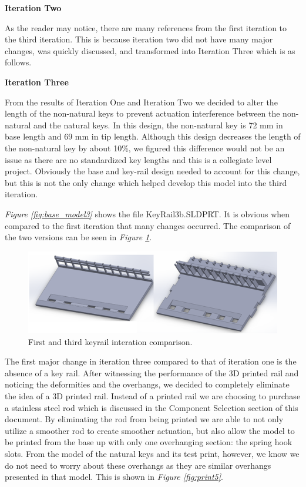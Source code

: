 \textbf{Iteration Two}

As the reader may notice, there are many references from the first iteration to the third iteration. This is because iteration two did not have many major changes, was quickly discussed, and transformed into Iteration Three which is as follows.

\textbf{Iteration Three}

From the results of Iteration One and Iteration Two we decided to alter the length of the non-natural keys to prevent actuation interference between the non-natural and the natural keys. In this design, the non-natural key is 72 mm in base length and 69 mm in tip length. Although this design decreases the length of the non-natural key by about 10\%, we figured this difference would not be an issue as there are no standardized key lengths and this is a collegiate level project. Obviously the base and key-rail design needed to account for this change, but this is not the only change which helped develop this model into the third iteration.

\textit{Figure \ref{fig:base_model3}} shows the file KeyRail3b.SLDPRT. It is obvious when compared to the first iteration that many changes occurred. The comparison of the two versions can be seen in \textit{Figure \ref{fig:base_model2}}.

\begin{figure}[h!]
  \centering
  \includegraphics[width=0.8\linewidth]{image/BaseModel2.png}
  \caption{First and third keyrail interation comparison.}
  \label{fig:base_model2}
\end{figure}

The first major change in iteration three compared to that of iteration one is the absence of a key rail. After witnessing the performance of the 3D printed rail and noticing the deformities and the overhangs, we decided to completely eliminate the idea of a 3D printed rail. Instead of a printed rail we are choosing to purchase a stainless steel rod which is discussed in the Component Selection section of this document. By eliminating the rod from being printed we are able to not only utilize a smoother rod to create smoother actuation, but also allow the model to be printed from the base up with only one overhanging section: the spring hook slots. From the model of the natural keys and its test print, however, we know we do not need to worry about these overhangs as they are similar overhangs presented in that model. This is shown in \textit{Figure \ref{fig:print5}}.

